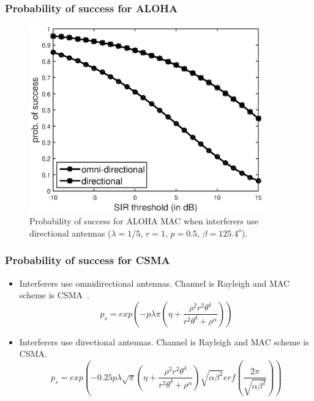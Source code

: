 \documentclass{beamer}
\begin{document}
\begin{frame}
\frametitle{\color{WPI_red} Probability of success for ALOHA}

\begin{figure}
    \centering
    \includegraphics[resolution=2400, width=0.9\textwidth]{aloha.eps}
    \caption{Probability of success for ALOHA MAC when interferers use directional antennas ($\lambda=1/5$, $r=1$, $p=0.5$, $\beta=125.4^o$).}
\end{figure}



\end{frame}


\begin{frame}
\frametitle{\color{WPI_red} Probability of success for CSMA}
\begin{itemize}

\item Interferers use omnidirectional antennas. Channel is Rayleigh and MAC scheme is CSMA~\cite{haenggi2009}.
\begin{equation*}
p_s = exp\left(-p\lambda\pi \left(\eta+\frac{\rho^2r^2\theta^\delta}{r^2\theta^\delta+\rho^\alpha}\right)\right)
\end{equation*}

\item Interferers use directional antennas. Channel is Rayleigh and MAC scheme is CSMA.
\begin{equation*}
p_s = exp\left(-0.25p\lambda\sqrt{\pi}  \left(\eta+\frac{\rho^2r^2\theta^\delta}{r^2\theta^\delta+\rho^\alpha}\right)\sqrt{\alpha\beta^2} erf\left(\frac{2\pi}{\sqrt{\alpha\beta^2}}\right)\right)
\end{equation*}



\end{itemize}

\end{frame}
\end{document}
